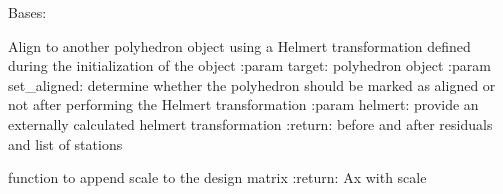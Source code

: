 \documentclass[letterpaper,10pt,english]{sphinxmanual}
\begin{document}
\begin{fulllineitems}
\label{\detokenize{stacker:stacker.pyStack.Polyhedron}}
\pysigstartsignatures
{}
\pysigstopsignatures
\sphinxAtStartPar
Bases: 

\begin{fulllineitems}
\label{\detokenize{stacker:stacker.pyStack.Polyhedron.align}}
\pysigstartsignatures
{}
\pysigstopsignatures
\sphinxAtStartPar
Align to another polyhedron object using a Helmert transformation defined
during the initialization of the object
:param target: polyhedron object
:param set\_aligned: determine whether the polyhedron should be marked as aligned or not after performing the
Helmert transformation
:param helmert: provide an externally calculated helmert transformation
:return: before and after residuals and list of stations

\end{fulllineitems}


\begin{fulllineitems}
\label{\detokenize{stacker:stacker.pyStack.Polyhedron.ax}}
\pysigstartsignatures
{}
\pysigstopsignatures
\sphinxAtStartPar
function to append scale to the design matrix
:return: Ax with scale


\end{fulllineitems}
\end{fulllineitems}
\end{document}
